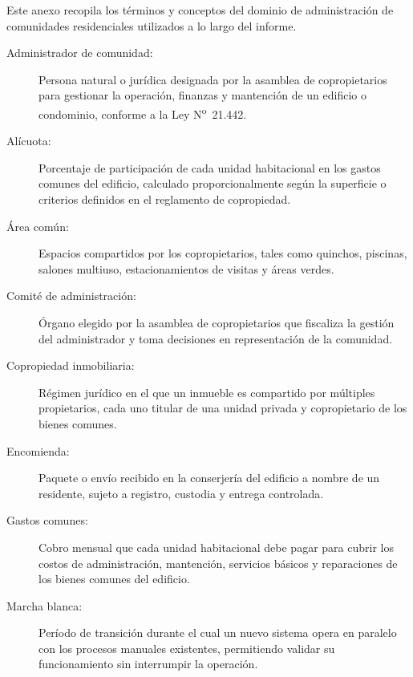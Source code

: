 
Este anexo recopila los términos y conceptos del dominio de administración de comunidades residenciales utilizados a lo largo del informe.

\begin{description}
    \item[Administrador de comunidad:] Persona natural o jurídica designada por la asamblea de copropietarios para gestionar la operación, finanzas y mantención de un edificio o condominio, conforme a la Ley N\textsuperscript{o}~21.442.

    \item[Alícuota:] Porcentaje de participación de cada unidad habitacional en los gastos comunes del edificio, calculado proporcionalmente según la superficie o criterios definidos en el reglamento de copropiedad.

    \item[Área común:] Espacios compartidos por los copropietarios, tales como quinchos, piscinas, salones multiuso, estacionamientos de visitas y áreas verdes.

    \item[Comité de administración:] Órgano elegido por la asamblea de copropietarios que fiscaliza la gestión del administrador y toma decisiones en representación de la comunidad.

    \item[Copropiedad inmobiliaria:] Régimen jurídico en el que un inmueble es compartido por múltiples propietarios, cada uno titular de una unidad privada y copropietario de los bienes comunes.

    \item[Encomienda:] Paquete o envío recibido en la conserjería del edificio a nombre de un residente, sujeto a registro, custodia y entrega controlada.

    \item[Gastos comunes:] Cobro mensual que cada unidad habitacional debe pagar para cubrir los costos de administración, mantención, servicios básicos y reparaciones de los bienes comunes del edificio.

    \item[Marcha blanca:] Período de transición durante el cual un nuevo sistema opera en paralelo con los procesos manuales existentes, permitiendo validar su funcionamiento sin interrumpir la operación.


\end{description}

